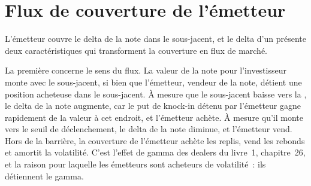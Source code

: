 \begin{omfigure}

\label{fig:dv:autocallables:coupons}
\end{omfigure}

\section{Flux de couverture de l'émetteur}

L'émetteur couvre le delta de la note dans le sous-jacent, et le delta d'un  présente deux caractéristiques qui transforment
la couverture en flux de marché.

La première concerne le sens du flux. La valeur de la note pour l'investisseur monte avec le sous-jacent, si bien que l'émetteur, vendeur de la note,
détient une position acheteuse dans le sous-jacent. À mesure que le sous-jacent baisse vers la , le delta de la note augmente, car le
put de knock-in détenu par l'émetteur gagne rapidement de la valeur à cet endroit, et l'émetteur achète. À mesure qu'il monte vers le seuil de déclenchement, le delta de la note
diminue, et l'émetteur vend. Hors de la barrière, la couverture de l'émetteur achète les replis, vend les rebonds et amortit
la volatilité. C'est l'effet de gamma des dealers du livre~1, chapitre~26, et la raison pour laquelle les émetteurs sont acheteurs de volatilité~: ils détiennent
le gamma.

